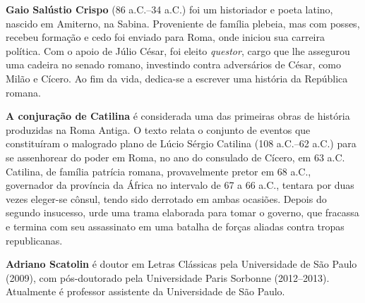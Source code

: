 \textbf{Gaio Salústio Crispo} (86 a.C.--34 a.C.) foi um historiador e poeta
latino, nascido em Amiterno, na Sabina. Proveniente de família plebeia, mas com
posses, recebeu formação e cedo foi enviado para Roma, onde iniciou sua
carreira política. Com o apoio de Júlio César, foi eleito \emph{questor}, cargo que
lhe assegurou uma cadeira no senado romano, investindo contra adversários de
César, como Milão e Cícero. Ao fim da vida, dedica-se a escrever uma história da
República romana.


\textbf{A conjuração de Catilina} é considerada uma das primeiras obras de
história produzidas na Roma Antiga. O
texto relata o conjunto de eventos que constituíram o malogrado plano de Lúcio
Sérgio Catilina (108 a.C.--62 a.C.) para se assenhorear do poder em Roma, no
ano do consulado de Cícero, em 63 a.C. Catilina, de família patrícia romana,
provavelmente pretor em 68 a.C., governador da província da África no intervalo
de 67 a 66 a.C., tentara por duas vezes eleger-se cônsul, tendo sido derrotado
em ambas ocasiões. Depois do segundo insucesso, urde uma trama elaborada
para tomar o governo, que fracassa e termina com seu assassinato em uma batalha
de forças aliadas contra tropas republicanas. 


\textbf{Adriano Scatolin} é doutor em Letras Clássicas pela
Universidade de São Paulo (2009), com pós-doutorado pela Universidade Paris
 Sorbonne (2012--2013). Atualmente é professor assistente da Universidade de
São Paulo.

